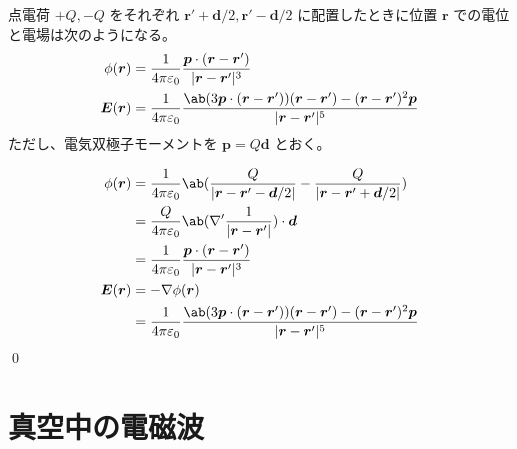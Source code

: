 \documentclass[uplatex,dvipdfmx,a4paper,11pt]{jlreq}
\makeatletter
\newcommand{\EE}{\bm{E}}
\newcommand{\rr}{\bm{r}}
\newcommand{\pp}{\bm{p}}
\newcommand{\vnabla}{\mathbf{\nabla}}
\numberwithin{equation}{section}
\theoremstyle{definition}
\renewenvironment{proof}[1][\proofname]{\par
  \normalfont
  \topsep6\p@\@plus6\p@ \trivlist
  \item[\hskip\labelsep{\bfseries #1}\@addpunct{\bfseries}]\ignorespaces\quad\par
}{%
  \qed\endtrivlist\@endpefalse
}
\renewcommand\proofname{証明}
\makeatother
\begin{document}
\begin{theorem}[電気双極子]
  点電荷 $+Q, -Q$ をそれぞれ $\rr'+\bm{d}/2, \rr'-\bm{d}/2$ に配置したときに位置 $\rr$ での電位と電場は次のようになる。
  \begin{align}
    \phi(\rr) & = \frac{1}{4\pi\varepsilon_0}\frac{\pp\cdot(\rr - \rr')}{|\rr - \rr'|^3}                                       \\
    \EE(\rr)  & = \frac{1}{4\pi\varepsilon_0}\frac{\ab(3\pp\cdot(\rr - \rr'))(\rr - \rr') - (\rr - \rr')^2\pp}{|\rr - \rr'|^5}
  \end{align}
  ただし、電気双極子モーメントを $\pp = Q\bm{d}$ とおく。
\end{theorem}
\begin{proof}
  \begin{align}
    \phi(\rr) & = \frac{1}{4\pi\varepsilon_0}\ab(\frac{Q}{|\rr - \rr' - \bm{d}/2|} - \frac{Q}{|\rr - \rr' + \bm{d}/2|})        \\
              & = \frac{Q}{4\pi\varepsilon_0}\ab(\vnabla'\frac{1}{|\rr - \rr'|})\cdot\bm{d}                                    \\
              & = \frac{1}{4\pi\varepsilon_0}\frac{\pp\cdot(\rr - \rr')}{|\rr - \rr'|^3}                                       \\
    \EE(\rr)  & = -\vnabla\phi(\rr)                                                                                            \\
              & = \frac{1}{4\pi\varepsilon_0}\frac{\ab(3\pp\cdot(\rr - \rr'))(\rr - \rr') - (\rr - \rr')^2\pp}{|\rr - \rr'|^5}
  \end{align}
\end{proof}

\begin{theorem}[電気双極子放射]

\end{theorem}

\begin{theorem}[電気四重極子]

\end{theorem}

\section{真空中の電磁波}
\end{document}
